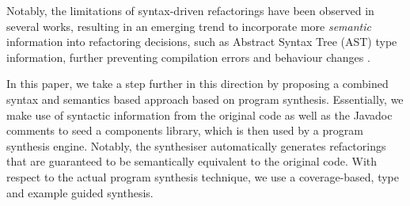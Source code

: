 \documentclass[runningheads,a4paper]{llncs}
\begin{document}
%
%


Notably, the limitations of syntax-driven refactorings have been observed
in several works, resulting in an emerging trend to incorporate more {\em semantic}
information into refactoring decisions, such as Abstract Syntax Tree (AST) 
type information,
further preventing compilation errors and behaviour changes
\cite{Steimann2011,Steimann2012Pilgrim,Steimann2011KollePilgrim}.

In this paper, we take a step further in this direction by proposing a
combined syntax and semantics based approach based on program
synthesis.  Essentially, we make use of syntactic information from the
original code as well as the Javadoc comments to seed a components
library, which is then used by a program synthesis engine.
Notably, the synthesiser automatically generates refactorings
that are guaranteed to be semantically equivalent to the original
code.  With respect to the actual program synthesis technique, we use
a coverage-based, type and example guided synthesis.
\end{document}
